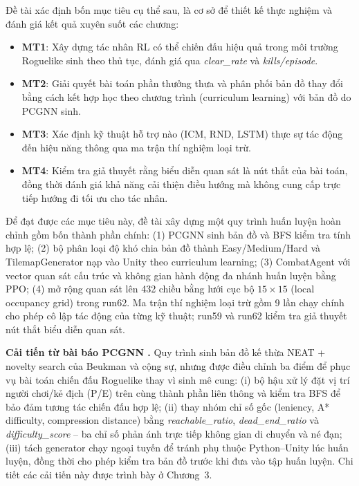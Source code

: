 \vspace{0.5cm}

Đề tài xác định bốn mục tiêu cụ thể sau, là cơ sở để thiết kế thực nghiệm và đánh giá kết quả xuyên suốt các chương:

\renewcommand{\labelitemi}{$-$}
\begin{itemize}
    \item \textbf{MT1}: Xây dựng tác nhân RL có thể chiến đấu hiệu quả trong môi trường Roguelike sinh theo thủ tục, đánh giá qua \textit{clear\_rate} và \textit{kills/episode}.
    \item \textbf{MT2}: Giải quyết bài toán phần thưởng thưa và phân phối bản đồ thay đổi bằng cách kết hợp học theo chương trình (curriculum learning) với bản đồ do PCGNN sinh.
    \item \textbf{MT3}: Xác định kỹ thuật hỗ trợ nào (ICM, RND, LSTM) thực sự tác động đến hiệu năng thông qua ma trận thí nghiệm loại trừ.
    \item \textbf{MT4}: Kiểm tra giả thuyết rằng biểu diễn quan sát là nút thắt của bài toán, đồng thời đánh giá khả năng cải thiện điều hướng mà không cung cấp trực tiếp hướng đi tối ưu cho tác nhân.
\end{itemize}

\vspace{0.5cm}

Để đạt được các mục tiêu này, đề tài xây dựng một quy trình huấn luyện hoàn chỉnh gồm bốn thành phần chính: (1) PCGNN sinh bản đồ và BFS kiểm tra tính hợp lệ; (2) bộ phân loại độ khó chia bản đồ thành Easy/Medium/Hard và TilemapGenerator nạp vào Unity theo curriculum learning; (3) CombatAgent với vector quan sát cấu trúc và không gian hành động đa nhánh huấn luyện bằng PPO; (4) mở rộng quan sát lên 432 chiều bằng lưới cục bộ $15\times15$ (local occupancy grid) trong run62. Ma trận thí nghiệm loại trừ gồm 9 lần chạy chính cho phép cô lập tác động của từng kỹ thuật; run59 và run62 kiểm tra giả thuyết nút thắt biểu diễn quan sát.

\textbf{Cải tiến từ bài báo PCGNN \cite{Beukman2022}.} Quy trình sinh bản đồ kế thừa NEAT + novelty search của Beukman và cộng sự, nhưng được điều chỉnh ba điểm để phục vụ bài toán chiến đấu Roguelike thay vì sinh mê cung: (i) bộ hậu xử lý đặt vị trí người chơi/kẻ địch (P/E) trên cùng thành phần liên thông và kiểm tra BFS để bảo đảm tương tác chiến đấu hợp lệ; (ii) thay nhóm chỉ số gốc (leniency, A* difficulty, compression distance) bằng \emph{reachable\_ratio}, \emph{dead\_end\_ratio} và \emph{difficulty\_score} -- ba chỉ số phản ánh trực tiếp không gian di chuyển và né đạn; (iii) tách generator chạy ngoại tuyến để tránh phụ thuộc Python--Unity lúc huấn luyện, đồng thời cho phép kiểm tra bản đồ trước khi đưa vào tập huấn luyện. Chi tiết các cải tiến này được trình bày ở Chương~3.

